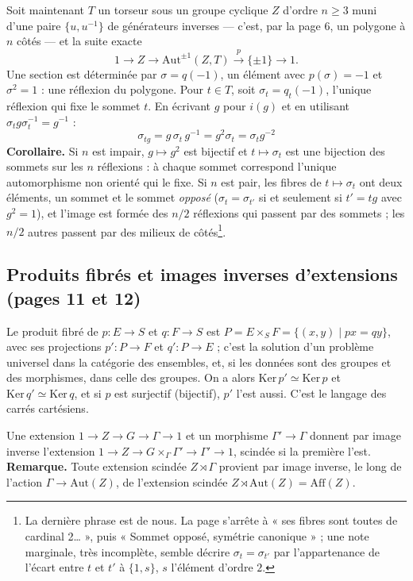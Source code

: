 \documentclass[11pt,a4paper]{article}
\begin{document}
Soit maintenant $T$ un torseur sous un groupe cyclique $Z$ d'ordre $n \geq 3$
muni d'une paire $\{u, u^{-1}\}$ de générateurs inverses --- c'est, par la
page 6, un polygone à $n$ côtés --- et la suite exacte
\[
  1 \to Z \to \mathrm{Aut}^{\pm 1}(Z, T) \xrightarrow{p} \{\pm 1\} \to 1 .
\]
Une section est déterminée par $\sigma = q(-1)$, un élément avec $p(\sigma) =
-1$ et $\sigma^2 = 1$ : une réflexion du polygone. Pour $t \in T$, soit
$\sigma_t = q_t(-1)$, l'unique réflexion qui fixe le sommet $t$. En écrivant
$g$ pour $i(g)$ et en utilisant $\sigma_t g \sigma_t^{-1} = g^{-1}$ :
\[
  \boxed{\ \sigma_{tg} = g\,\sigma_t\,g^{-1} = g^2 \sigma_t = \sigma_t g^{-2}\ }
\]
\textbf{Corollaire.} Si $n$ est impair, $g \mapsto g^2$ est bijectif et $t
\mapsto \sigma_t$ est une bijection des sommets sur les $n$ réflexions : à
chaque sommet correspond l'unique automorphisme non orienté qui le fixe. Si
$n$ est pair, les fibres de $t \mapsto \sigma_t$ ont deux éléments, un sommet
et le sommet \emph{opposé} ($\sigma_t = \sigma_{t'}$ si et seulement si $t' =
t g$ avec $g^2 = 1$), et l'image est formée des $n/2$ réflexions qui passent
par des sommets ; les $n/2$ autres passent par des milieux de
côtés\footnote{La dernière phrase est de nous. La page s'arrête à « ses fibres
sont toutes de cardinal 2… », puis « Sommet opposé, symétrie canonique » ; une
note marginale, très incomplète, semble décrire $\sigma_t = \sigma_{t'}$ par
l'appartenance de l'écart entre $t$ et $t'$ à $\{1, s\}$, $s$ l'élément
d'ordre $2$.}.

\subsection*{Produits fibrés et images inverses d'extensions (pages 11 et 12)}

Le produit fibré de $p : E \to S$ et $q : F \to S$ est $P = E \times_S F =
\{(x, y) \mid p x = q y\}$, avec ses projections $p' : P \to F$ et $q' : P \to
E$ ; c'est la solution d'un problème universel dans la catégorie des ensembles,
et, si les données sont des groupes et des morphismes, dans celle des groupes.
On a alors $\mathrm{Ker}\, p' \simeq \mathrm{Ker}\, p$ et $\mathrm{Ker}\, q'
\simeq \mathrm{Ker}\, q$, et si $p$ est surjectif (bijectif), $p'$ l'est
aussi. C'est le langage des carrés cartésiens.

Une extension $1 \to Z \to G \to \Gamma \to 1$ et un morphisme $\Gamma' \to
\Gamma$ donnent par image inverse l'extension $1 \to Z \to G \times_\Gamma
\Gamma' \to \Gamma' \to 1$, scindée si la première l'est.
\textbf{Remarque.} Toute extension scindée $Z \rtimes \Gamma$ provient par
image inverse, le long de l'action $\Gamma \to \mathrm{Aut}(Z)$, de
l'extension scindée $Z \rtimes \mathrm{Aut}(Z) = \mathrm{Aff}(Z)$.
\end{document}
